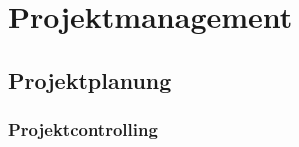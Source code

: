 
\clearpage
{}
\recalctypearea
    \chapter{Projektmanagement}
    \section{Projektplanung}
    \subsection{Projektcontrolling}
    
